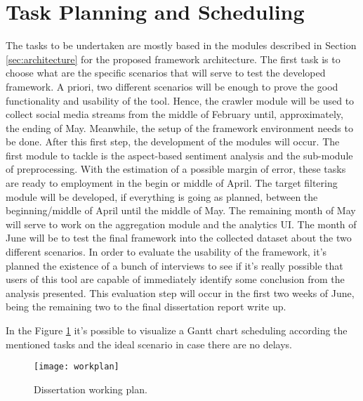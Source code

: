 \section{Task Planning and Scheduling}
The tasks to be undertaken are mostly based in the modules described in Section \ref{sec:architecture} for the proposed framework architecture.
The first task is to choose what are the specific scenarios that will serve to test the developed framework. A priori, two different scenarios will be enough to prove the good functionality and usability of the tool. Hence, the crawler module will be used to collect social media streams from the middle of February until, approximately, the ending of May. Meanwhile, the setup of the framework environment needs to be done. After this first step, the development of the modules will occur. The first module to tackle is the aspect-based sentiment analysis and the sub-module of preprocessing. With the estimation of a possible margin of error, these tasks are ready to employment in the begin or middle of April. The target filtering module will be developed, if everything is going as planned, between the beginning/middle of April until the middle of May. The remaining month of May will serve to work on the aggregation module and the analytics UI. The month of June will be to test the final framework into the collected dataset about the two different scenarios. In order to evaluate the usability of the framework, it's planned the existence of a bunch of interviews to see if it's really possible that users of this tool are capable of immediately identify some conclusion from the analysis presented. This evaluation step will occur in the first two weeks of June, being the remaining two to the final dissertation report write up.

In the Figure \ref{fig:workplan} it's possible to visualize a Gantt chart scheduling according the mentioned tasks and the ideal scenario in case there are no delays.

\begin{figure}
  \centering
    \texttt{[image: workplan]}
    \caption{Dissertation working plan.}
    \label{fig:workplan}
\end{figure}

\vspace*{12mm} 
